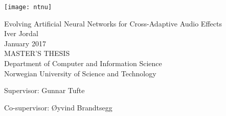 
\thispagestyle{empty}
\texttt{[image: ntnu]}
\mbox{}\\[6pc]
\begin{center}
\Huge{Evolving Artificial Neural Networks for Cross-Adaptive Audio Effects}\\[2pc]

\Large{Iver Jordal}\\[1pc]
\large{January 2017}\\[2pc]

MASTER'S THESIS\\
Department of Computer and Information Science\\
Norwegian University of Science and Technology
\end{center}
\vfill

\noindent Supervisor: Gunnar Tufte

\noindent Co-supervisor: Øyvind Brandtsegg

